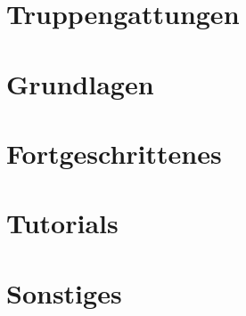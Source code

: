 \documentclass[pdftex,fontsize=12pt,a4paper,numbers=noenddot]{scrartcl}
\begin{document}


\newpage
{} %
\tableofcontents %

\newpage
{} %


\section{Truppengattungen}











\section{Grundlagen}








\section{Fortgeschrittenes}










\section{Tutorials}


\section{Sonstiges}






\cleardoublepage
\appendix

\listoftables
{}
\end{document}
